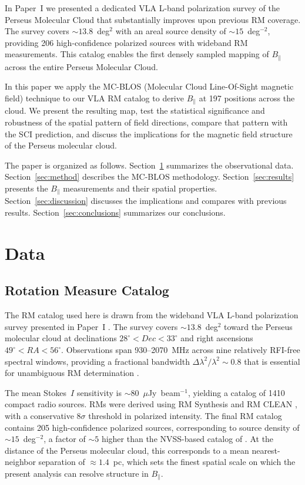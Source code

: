 \documentclass[twocolumn]{aastex701}
\begin{document}
In Paper~I \citep{hajizadeh2026comprehensive} we presented a dedicated VLA
L-band polarization survey of the Perseus Molecular Cloud that substantially improves upon
previous RM coverage. The survey covers $\sim 13.8$~deg$^2$ with an areal
source density of $\sim 15$~deg$^{-2}$, providing 206 high-confidence
polarized sources with wideband RM measurements. This catalog enables the
first densely sampled mapping of $B_\parallel$ across the entire Perseus Molecular Cloud.

In this paper we apply the MC-BLOS (Molecular Cloud Line-Of-Sight magnetic
field) technique \citep{tahani2018,tahani2025mcblos} to our VLA RM catalog to
derive $B_\parallel$ at 197 positions across the cloud. We present the
resulting map, test the statistical significance and robustness of the
spatial pattern of field directions, compare that pattern with the SCI
prediction, and discuss the implications for the magnetic field structure of
the Perseus molecular cloud.

The paper is organized as follows. Section~\ref{sec:data} summarizes the
observational data. Section~\ref{sec:method} describes the MC-BLOS
methodology. Section~\ref{sec:results} presents the $B_\parallel$
measurements and their spatial properties. Section~\ref{sec:discussion}
discusses the implications and compares with previous results.
Section~\ref{sec:conclusions} summarizes our conclusions.

\section{Data}
\label{sec:data}

\subsection{Rotation Measure Catalog}

The RM catalog used here is drawn from the wideband VLA L-band polarization
survey presented in Paper~I \citep{hajizadeh2026comprehensive}. The survey
covers $\sim 13.8$~deg$^2$ toward the Perseus molecular cloud at declinations
$28^\circ < Dec < 33^\circ$ and right ascensions
$49^\circ < RA < 56^\circ$. Observations span
930--2070~MHz across nine relatively RFI-free spectral windows, providing a
fractional bandwidth $\Delta\lambda^2/\lambda^2 \sim 0.8$ that is essential
for unambiguous RM determination \citep{brentjens2005}.

The mean Stokes~$I$ sensitivity is $\sim 80$~$\mu$Jy~beam$^{-1}$, yielding a
catalog of 1410 compact radio sources. RMs were derived using RM Synthesis
\citep{burn1966,brentjens2005} and RM CLEAN \citep{heald2009}, with a
conservative $8\sigma$ threshold in polarized intensity. The final RM catalog
contains 205 high-confidence polarized sources, corresponding to 
source density of $\sim 15$~deg$^{-2}$, a factor of $\sim 5$ higher than the
NVSS-based catalog of \citet{taylor2009}. At the distance of the Perseus molecular cloud, this
corresponds to a mean nearest-neighbor separation of $\approx 1.4$~pc, which
sets the finest spatial scale on which the present analysis can resolve
structure in $B_\parallel$.
\end{document}
